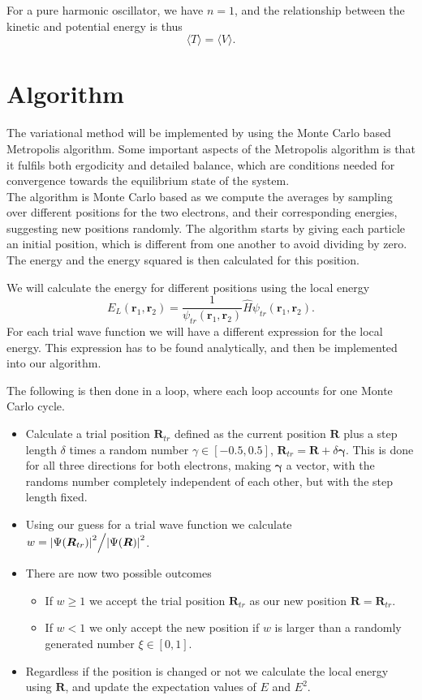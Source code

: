 \documentclass[%
 reprint,
nofootinbib,
aps,
]{revtex4-1}
\begin{document}
For a pure harmonic oscillator, we have $n = 1$, and the relationship between the kinetic and potential energy is thus
\begin{equation}
  \langle T \rangle = \langle V \rangle. \label{viral}
\end{equation}


\section{Algorithm}\label{sec:algorithms}
The variational method will be implemented by using the Monte Carlo based Metropolis algorithm. Some important aspects of the Metropolis algorithm is that it fulfils both ergodicity and detailed balance, which are conditions needed for convergence towards the equilibrium state of the system.\\
The algorithm is Monte Carlo based as we compute the averages by sampling over different positions for the two electrons, and their corresponding energies, suggesting new positions randomly. The algorithm starts by giving each particle an initial position, which is different from one another to avoid dividing by zero. The energy and the energy squared is then calculated for this position.

We will calculate the energy for different positions using the local energy
\begin{equation}
  \label{eq:E_local}
  E_L(\bm{r}_1, \bm{r}_2) = \frac{1}{\psi_{tr}(\bm{r}_1, \bm{r}_2)}\hat{H}\psi_{tr}(\bm{r}_1, \bm{r}_2).
\end{equation}
For each trial wave function we will have a different expression for the local energy. This expression has to be found analytically, and then be implemented into our algorithm.

The following is then done in a loop, where each loop accounts for one Monte Carlo cycle.
\begin{itemize}
    \item Calculate a trial position $\bm{R}_{tr}$ defined as the current position $\bm{R}$ plus a step length $\delta$ times a random number $\gamma \in [-0.5, 0.5]$, $\bm{R}_{tr} = \bm{R} + \delta\bm{\gamma}$. This is done for all three directions for both electrons, making $\bm{\gamma}$ a vector, with the randoms number completely independent of each other, but with the step length fixed.
    \item Using our guess for a trial wave function we calculate $w = \abs{\Psi(\bm{R}_{tr})}^2\Big/\abs{\Psi(\bm{R})}^2$.
    \item There are now two possible outcomes
    \begin{itemize}
        \item If $ w \geq 1 $ we accept the trial position $\bm{R}_{tr}$ as our new position $\bm{R} = \bm{R}_{tr}$.
        \item If $w  < 1$ we only accept the new position if $w$ is larger than a randomly generated number $\xi\in[0, 1]$.
    \end{itemize}
    \item Regardless if the position is changed or not we calculate the local energy using $\bm{R}$, and update the expectation values of $E$ and $E^2$.
\end{itemize}
\end{document}
